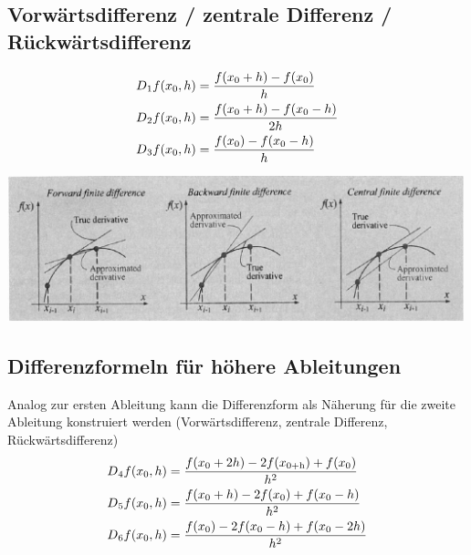 \documentclass{article}
\newenvironment{Figure}
	{\par\medskip\noindent\minipage{\linewidth}}
	{\endminipage\par\medskip}
\theoremstyle{satz}
\theoremstyle{definition}
\begin{document}
\subsection{Vorwärtsdifferenz / zentrale Differenz / Rückwärtsdifferenz}
\begin{equation}
\begin{split}
D\textsubscript{1}f(x\textsubscript{0},h) & = \frac{f(x\textsubscript{0}+h)-f(x\textsubscript{0})}{h}\\
D\textsubscript{2}f(x\textsubscript{0},h) & = \frac{f(x\textsubscript{0}+h)-f(x\textsubscript{0} -h)}{2h}\\
D\textsubscript{3}f(x\textsubscript{0},h) & = \frac{f(x\textsubscript{0})-f(x\textsubscript{0}-h)}{h}
\end{split}
\end{equation}

\begin{Figure}
\centering
\includegraphics[width=500px]{img/vorwaerts_rueckwaerts_zentral_differenz.png}
	\label{fig:Vorwärtsdiferenz (links), Rückwärtsdiferenz (Mitte) und zentrale Diferenz (rechts) als Näherung für die Ableitung $f'(xi)$}
\end{Figure}

\subsection{Differenzformeln für höhere Ableitungen}
Analog zur ersten Ableitung kann die Differenzform als Näherung für die zweite Ableitung konstruiert werden (Vorwärtsdifferenz, zentrale Differenz, Rückwärtsdifferenz)
\begin{equation}
\begin{split}
D\textsubscript{4}f(x\textsubscript{0},h) & = \frac{f(x\textsubscript{0}+2h)-2f(x\textsubscript{0+h})+f(x\textsubscript{0})}{h^2}\\
D\textsubscript{5}f(x\textsubscript{0},h) & = \frac{f(x\textsubscript{0}+h)-2f(x\textsubscript{0})+f(x\textsubscript{0}-h)}{h^2}\\
D\textsubscript{6}f(x\textsubscript{0},h) & = \frac{f(x\textsubscript{0})-2f(x\textsubscript{0}-h)+f(x\textsubscript{0}-2h)}{h^2}
\end{split}
\end{equation}
\end{document}
